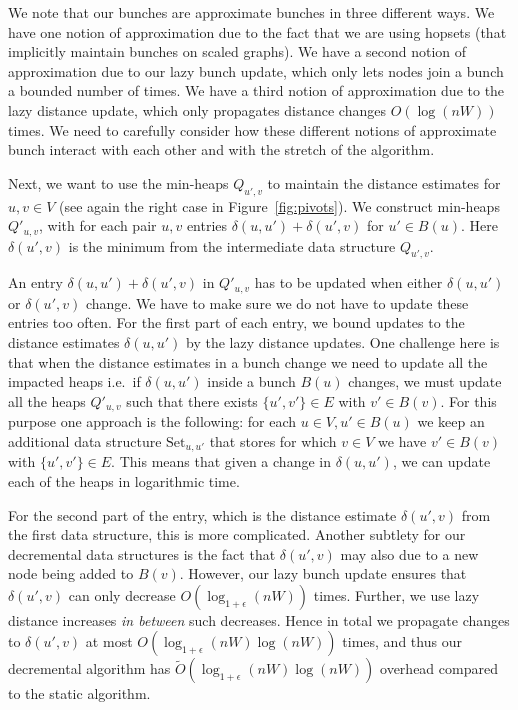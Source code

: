 We note that our bunches are approximate bunches in three different ways. We have one notion of approximation due to the fact that we are using hopsets (that implicitly maintain bunches on scaled graphs). We have a second notion of approximation due to our lazy bunch update, which only lets nodes join a bunch a bounded number of times. We have a third notion of approximation due to the lazy distance update, which only propagates distance changes $O(\log(nW))$ times. We need to carefully consider how these different notions of approximate bunch interact with each other and with the stretch of the algorithm.

Next, we want to use the min-heaps $Q_{u',v}$ to maintain the distance estimates for $u,v\in V$ (see again the right case in Figure~\ref{fig:pivots}). We construct min-heaps $Q'_{u,v}$, with for each pair $u,v$ entries $\delta(u,u')+\delta(u',v)$ for $u' \in B(u)$. Here $\delta(u',v)$ is the minimum from the intermediate data structure $Q_{u',v}$. 

An entry $\delta(u,u')+\delta(u',v)$ in $Q'_{u,v}$ has to be updated when either $\delta(u,u')$ or $\delta(u',v)$ change. We have to make sure we do not have to update these entries too often. For the first part of each entry, we bound updates to the distance estimates $\delta(u,u')$ by the lazy distance updates. One challenge here is that when the distance estimates in a bunch change we need to update all the impacted heaps i.e.~if $\delta(u,u')$ inside a bunch $B(u)$ changes, we must update all the heaps $Q'_{u,v}$ such that there exists $\{u',v'\} \in E$ with $v'\in B(v)$. For this purpose one approach is the following: for each $u \in V,u' \in B(u)$ we keep an additional data structure $\text{Set}_{u,u'}$ that stores for which $v \in V$ we have $v' \in B(v)$ with $\{u',v'\}\in E$. This means that given a change in $\delta(u,u')$, we can update each of the heaps in logarithmic time. 


For the second part of the entry, which is the distance estimate $\delta(u',v)$ from the first data structure, this is more complicated. Another subtlety for our decremental data structures is the fact that $\delta(u',v)$ may also  due to a new node being added to $B(v)$. However, our lazy bunch update ensures that $\delta(u',v)$ can only decrease $O(\log_{1+\epsilon}(nW))$ times. Further, we use lazy distance increases \textit{in between} such decreases. Hence in total we propagate changes to $\delta(u',v)$ at most $O(\log_{1+\epsilon}(nW)\log(nW))$ times, and thus our decremental algorithm has $\tilde O(\log_{1+\epsilon}(nW)\log(nW))$ overhead compared to the static algorithm.

